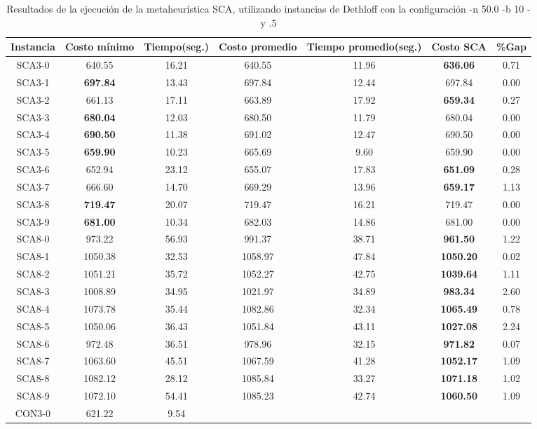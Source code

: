 \begin{table}[ht]
\caption{Resultados de la ejecución de la metaheurística SCA, utilizando instancias de Dethloff con la configuración -n 50.0 -b 10 -y .5}
\centering
\small
\begin{tabular}{c c c c c c c}
\hline\hline
Instancia & Costo mínimo & Tiempo(seg.) & Costo promedio & Tiempo promedio(seg.) & Costo SCA & \%Gap \\ [0.5ex]
\hline
SCA3-0 & 640.55 & 16.21 & 
640.55 & 11.96 & \bf{636.06} & 
0.71\\SCA3-1 & \bf{697.84} & 13.43 & 
697.84 & 12.44 & 697.84 & 0.00\\
SCA3-2 & 661.13 & 17.11 & 
663.89 & 17.92 & \bf{659.34} & 
0.27\\SCA3-3 & \bf{680.04} & 12.03 & 
680.50 & 11.79 & 680.04 & 0.00\\
SCA3-4 & \bf{690.50} & 11.38 & 
691.02 & 12.47 & 690.50 & 0.00\\
SCA3-5 & \bf{659.90} & 10.23 & 
665.69 & 9.60 & 659.90 & 0.00\\
SCA3-6 & 652.94 & 23.12 & 
655.07 & 17.83 & \bf{651.09} & 
0.28\\SCA3-7 & 666.60 & 14.70 & 
669.29 & 13.96 & \bf{659.17} & 
1.13\\SCA3-8 & \bf{719.47} & 20.07 & 
719.47 & 16.21 & 719.47 & 0.00\\
SCA3-9 & \bf{681.00} & 10.34 & 
682.03 & 14.86 & 681.00 & 0.00\\
SCA8-0 & 973.22 & 56.93 & 
991.37 & 38.71 & \bf{961.50} & 
1.22\\SCA8-1 & 1050.38 & 32.53 & 
1058.97 & 47.84 & \bf{1050.20} & 
0.02\\SCA8-2 & 1051.21 & 35.72 & 
1052.27 & 42.75 & \bf{1039.64} & 
1.11\\SCA8-3 & 1008.89 & 34.95 & 
1021.97 & 34.89 & \bf{983.34} & 
2.60\\SCA8-4 & 1073.78 & 35.44 & 
1082.86 & 32.34 & \bf{1065.49} & 
0.78\\SCA8-5 & 1050.06 & 36.43 & 
1051.84 & 43.11 & \bf{1027.08} & 
2.24\\SCA8-6 & 972.48 & 36.51 & 
978.96 & 32.15 & \bf{971.82} & 
0.07\\SCA8-7 & 1063.60 & 45.51 & 
1067.59 & 41.28 & \bf{1052.17} & 
1.09\\SCA8-8 & 1082.12 & 28.12 & 
1085.84 & 33.27 & \bf{1071.18} & 
1.02\\SCA8-9 & 1072.10 & 54.41 & 
1085.23 & 42.74 & \bf{1060.50} & 
1.09\\CON3-0 & 621.22 & 9.54 & 

\end{tabular}
\end{table}
